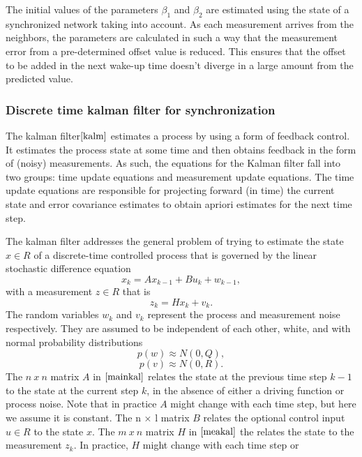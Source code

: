 \documentclass[journal]{IEEEtran}
\begin{document}
\par
The initial values of the parameters $\beta_1$ and $\beta_2$ are
estimated using the state of a synchronized network taking into account.
As each measurement arrives from the neighbors, the parameters are
calculated in such a way that the measurement error from a
pre-determined offset value is reduced. This ensures that the offset
to be added in the next wake-up time doesn't diverge in a large
amount from the predicted value.
\subsubsection{\textbf{Discrete time kalman filter for synchronization}}
The kalman filter$\cite{kalm}$ estimates a process by using a form of feedback
control. It estimates the process state at some time and
then obtains feedback in the form of (noisy) measurements. As such,
the equations for the Kalman filter fall into two groups: time
update equations and measurement update equations. The time update
equations are responsible for projecting forward (in time) the
current state and error covariance estimates to obtain apriori
estimates for the next time step.
\par
The kalman filter addresses the general problem of trying to
estimate the state $x \in R$ of a discrete-time controlled process that is
governed by the linear stochastic difference equation
\begin{equation}
 x_k = Ax_{k-1} + Bu_k + w_{k-1} , \label{mainkal}
\end{equation}
with a measurement $z \in R$ that is
\begin{equation}
 z_k = Hx_k + v_k. \label{meakal}
\end{equation}
The random variables $w_k$ and $v_k$ represent the process and
measurement noise respectively. They are assumed to be
independent of each other, white, and with normal probability
distributions
\begin{equation}
 p(w) \approx N(0,Q),
\end{equation}
\begin{equation}
 p(v) \approx N(0,R).
\end{equation}
The $n\ x\ n$ matrix $A$ in $\ref{mainkal}$ relates the state at the previous time step $k-1$ to the state at the current step $k$, in the absence of either a driving function or process noise. Note that in practice $A$ might change with each time step, but                                                                   
here we assume it is constant. The n × l matrix $B$ relates the optional control input $u \in R$ to the state $x$. The $m\ x\ n$ matrix $H$ in $\ref{meakal}$ the relates the state to the measurement $z_k$. In practice, $H$ might change with each time step or
\end{document}

